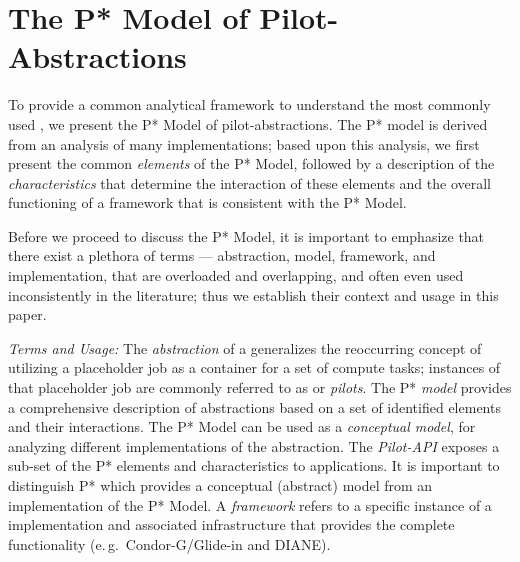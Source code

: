\documentclass[conference]{IEEEtran}
\begin{document}


\section{The P* Model of Pilot-\\Abstractions}
\label{sec:pilot-model}


To provide a common analytical framework to understand the most
commonly used \pilotjobs, we present the P* Model of
pilot-abstractions. The P* model is derived from an analysis of many
\pilotjob implementations; based upon this analysis, we first present
the common {\it elements} of the P* Model, followed by a description
of the {\it characteristics} that determine the interaction of these
elements and the overall functioning of a \pilotjob framework that is
consistent with the P* Model.


 
Before we proceed to discuss the P* Model, it is important to
emphasize that there exist a plethora of terms --- abstraction, model,
framework, and implementation, that are overloaded and overlapping,
and often even used inconsistently in the literature; thus we
establish their context and usage in this paper.

\emph{Terms and Usage:} The \emph{ abstraction} of a \pilotjob
generalizes the reoccurring concept of utilizing a placeholder job as a
container for a set of compute tasks; instances of that placeholder
job are commonly referred to as \emph{\pilotjobs} or
\emph{pilots}. The P* \emph{model} provides a %
comprehensive description of \pilotjob abstractions based on a set of
identified elements and their interactions. The P* Model can be used
as a {\it conceptual model}, for analyzing different implementations
of the \pilotjob abstraction. The \emph{Pilot-API} exposes a sub-set
of the P* elements and characteristics to applications. 
It is important to distinguish P* which provides a conceptual (abstract) model 
from an implementation of the P* Model. A \emph{\pilotjob framework} refers to a 
specific instance of a \pilotjob implementation and associated infrastructure 
that provides the complete \pilotjob functionality (e.\,g.\ Condor-G/Glide-in and
DIANE). 
\end{document}
